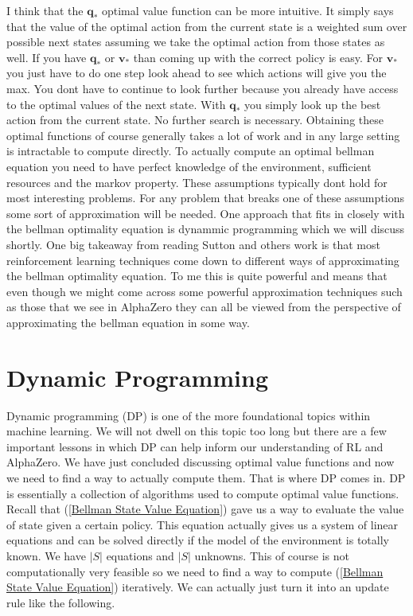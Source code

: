 I think that the $\mathbf{q_{*}}$ optimal value function can be more intuitive. It simply says that the value of the optimal action from the current state is a weighted sum over possible next states assuming we take the optimal action from those states as well. If you have $\mathbf{q_{*}}$ or $\mathbf{v_{*}}$ than coming up with the correct policy is easy. For $\mathbf{v_{*}}$ you just have to do one step look ahead to see which actions will give you the max. You dont have to continue to look further because you already have access to the optimal values of the next state. With $\mathbf{q_{*}}$ you simply look up the best action from the current state. No further search is necessary. Obtaining these optimal functions of course generally takes a lot of work and in any large setting is intractable to compute directly. To actually compute an optimal bellman equation you need to have perfect knowledge of the environment, sufficient resources and the markov property. These assumptions typically dont hold for most interesting problems. For any problem that breaks one of these assumptions some sort of approximation will be needed. One approach that fits in closely with the bellman optimality equation is dynammic programming which we will discuss shortly. One big takeaway from reading Sutton and others work is that most reinforcement learning techniques come down to different ways of approximating the bellman optimality equation. To me this is quite powerful and means that even though we might come across some powerful approximation techniques such as those that we see in AlphaZero they can all be viewed from the perspective of approximating the bellman equation in some way. 

\section{Dynamic Programming}

Dynamic programming (DP) is one of the more foundational topics within machine learning. We will not dwell on this topic too long but there are a few important lessons in which DP can help inform our understanding of RL and AlphaZero. We have just concluded discussing optimal value functions and now we need to find a way to actually compute them. That is where DP comes in. DP is essentially a collection of algorithms used to compute optimal value functions. Recall that (\ref{Bellman State Value Equation}) gave us a way to evaluate the value of state given a certain policy. This equation actually gives us a system of linear equations and can be solved directly if the model of the environment is totally known. We have $|S|$ equations and $|S|$ unknowns. This of course is not computationally very feasible so we need to find a way to compute (\ref{Bellman State Value Equation}) iteratively. We can actually just turn it into an update rule like the following. 

